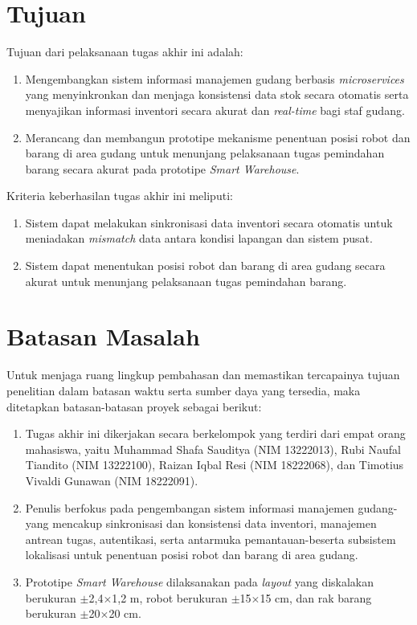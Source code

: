 \section{Tujuan}
Tujuan dari pelaksanaan tugas akhir ini adalah:
\begin{enumerate}
\item Mengembangkan sistem informasi manajemen gudang berbasis \textit{microservices} yang menyinkronkan dan menjaga konsistensi data stok secara otomatis serta menyajikan informasi inventori secara akurat dan \textit{real-time} bagi staf gudang.
\item Merancang dan membangun prototipe mekanisme penentuan posisi robot dan barang di area gudang untuk menunjang pelaksanaan tugas pemindahan barang secara akurat pada prototipe \textit{Smart Warehouse}.
\end{enumerate}
Kriteria keberhasilan tugas akhir ini meliputi:
\begin{enumerate}
\item Sistem dapat melakukan sinkronisasi data inventori secara otomatis untuk meniadakan \textit{mismatch} data antara kondisi lapangan dan sistem pusat.
\item Sistem dapat menentukan posisi robot dan barang di area gudang secara akurat untuk menunjang pelaksanaan tugas pemindahan barang.
\end{enumerate}

\section{Batasan Masalah}
\label{sec:batasan-masalah}
Untuk menjaga ruang lingkup pembahasan dan memastikan tercapainya tujuan penelitian dalam batasan waktu serta sumber daya yang tersedia, maka ditetapkan batasan-batasan proyek sebagai berikut:
\begin{enumerate}
\item Tugas akhir ini dikerjakan secara berkelompok yang terdiri dari empat orang mahasiswa, yaitu Muhammad Shafa Sauditya (NIM 13222013), Rubi Naufal Tiandito (NIM 13222100), Raizan Iqbal Resi (NIM 18222068), dan Timotius Vivaldi Gunawan (NIM 18222091).
\item Penulis berfokus pada pengembangan sistem informasi manajemen gudang-yang mencakup sinkronisasi dan konsistensi data inventori, manajemen antrean tugas, autentikasi, serta antarmuka pemantauan-beserta subsistem lokalisasi untuk penentuan posisi robot dan barang di area gudang.
\item Prototipe \textit{Smart Warehouse} dilaksanakan pada \textit{layout} yang diskalakan berukuran $\pm$2,4$\times$1,2 m, robot berukuran $\pm$15$\times$15 cm, dan rak barang berukuran $\pm$20$\times$20 cm.
\end{enumerate}

